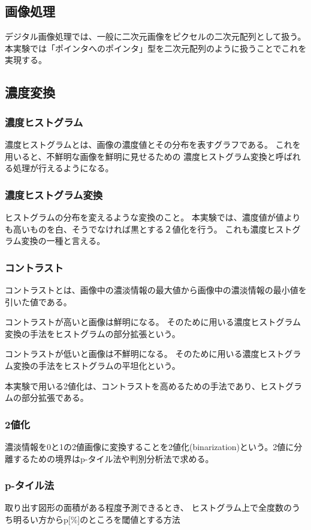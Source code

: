\documentclass{jarticle}[2012/05/15]
\begin{document}
\subsection{画像処理}
デジタル画像処理では、一般に二次元画像をピクセルの二次元配列として扱う。本実験では「ポインタへのポインタ」型を二次元配列のように扱うことでこれを実現する。
\par
\subsection{濃度変換}
\subsubsection{濃度ヒストグラム}
濃度ヒストグラムとは、画像の濃度値とその分布を表すグラフである。
これを用いると、不鮮明な画像を鮮明に見せるための
濃度ヒストグラム変換と呼ばれる処理が行えるようになる。
\par
\subsubsection{濃度ヒストグラム変換}
ヒストグラムの分布を変えるような変換のこと。
本実験では、濃度値が値よりも高いものを白、そうでなければ黒とする２値化を行う。
これも濃度ヒストグラム変換の一種と言える。
\par
\subsubsection{コントラスト}
コントラストとは、画像中の濃淡情報の最大値から画像中の濃淡情報の最小値を引いた値である。
\par
コントラストが高いと画像は鮮明になる。
そのために用いる濃度ヒストグラム変換の手法をヒストグラムの部分拡張という。
\par
コントラストが低いと画像は不鮮明になる。
そのために用いる濃度ヒストグラム変換の手法をヒストグラムの平坦化という。
\par
本実験で用いる2値化は、コントラストを高めるための手法であり、ヒストグラムの部分拡張である。
\par
\subsubsection{2値化}
濃淡情報を0と1の2値画像に変換することを2値化(binarization)という。2値に分離するための境界はp-タイル法や判別分析法で求める。
\par
\subsubsection{p-タイル法}
取り出す図形の面積がある程度予測できるとき、
ヒストグラム上で全度数のうち明るい方からp[\%]のところを閾値とする方法
\par
\end{document}
